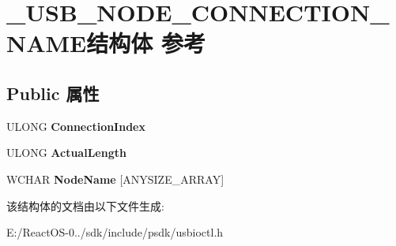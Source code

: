 \hypertarget{struct___u_s_b___n_o_d_e___c_o_n_n_e_c_t_i_o_n___n_a_m_e}{}\section{\+\_\+\+U\+S\+B\+\_\+\+N\+O\+D\+E\+\_\+\+C\+O\+N\+N\+E\+C\+T\+I\+O\+N\+\_\+\+N\+A\+M\+E结构体 参考}
\label{struct___u_s_b___n_o_d_e___c_o_n_n_e_c_t_i_o_n___n_a_m_e}
\subsection*{Public 属性}
\begin{DoxyCompactItemize}
\item 
\mbox{\label{struct___u_s_b___n_o_d_e___c_o_n_n_e_c_t_i_o_n___n_a_m_e_a9482df343e5db6d2da0370bd66809818}} 
U\+L\+O\+NG {\bfseries Connection\+Index}
\item 
\mbox{\label{struct___u_s_b___n_o_d_e___c_o_n_n_e_c_t_i_o_n___n_a_m_e_aea164a8f6f1614867eee28efee9c963d}} 
U\+L\+O\+NG {\bfseries Actual\+Length}
\item 
\mbox{\label{struct___u_s_b___n_o_d_e___c_o_n_n_e_c_t_i_o_n___n_a_m_e_a8c6c4d622e2636a03e7de999f75b0cc1}} 
W\+C\+H\+AR {\bfseries Node\+Name} \mbox{[}A\+N\+Y\+S\+I\+Z\+E\+\_\+\+A\+R\+R\+AY\mbox{]}
\end{DoxyCompactItemize}


该结构体的文档由以下文件生成\+:\begin{DoxyCompactItemize}
\item 
E\+:/\+React\+O\+S-\/0../sdk/include/psdk/usbioctl.\+h\end{DoxyCompactItemize}
